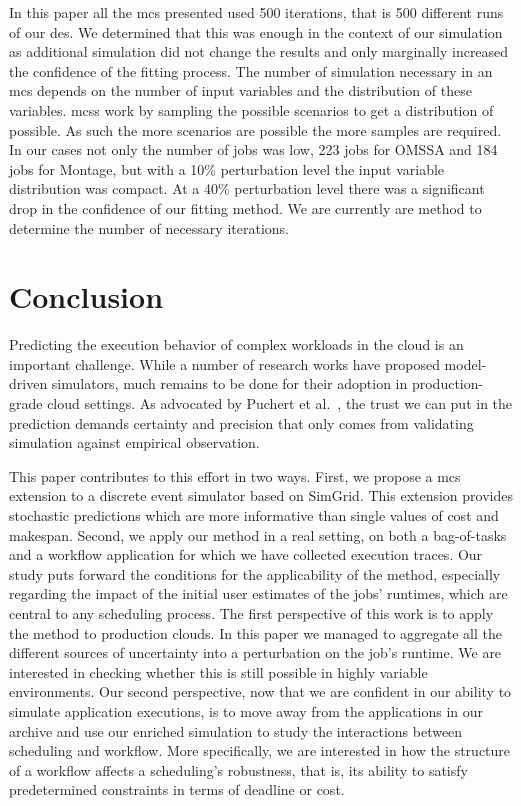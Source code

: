 \documentclass[10pt,conference,compsocconf]{IEEEtran}
\begin{document}
In this paper all the \ac{mcs} presented used 500 iterations, that is 500
different runs of our \ac{des}. We determined that this was enough in the
context of our simulation as additional simulation did not change the results
and only marginally increased the confidence of the fitting process. The number
of simulation necessary in an \ac{mcs} depends on the number of input variables
and the distribution of these variables. \aclp{mcs} work by sampling the possible
scenarios to get a distribution of possible. As such the more scenarios are
possible the more samples are required. In our cases not only the number of jobs
was low, 223 jobs for OMSSA and 184 jobs for Montage, but with a 10\%
perturbation level the input variable distribution was compact. At a 40\%
perturbation level there was a significant drop in the confidence of our fitting
method. We are currently are method to determine the number of necessary
iterations.

\section{Conclusion}
Predicting  the execution  behavior  of complex  workloads in  the  cloud is  an
important challenge. While a number of research works have proposed model-driven
simulators, much remains to be done for their adoption in production-grade cloud
settings. As  advocated by Puchert  et al.~\cite{PucherGWK15}, the trust  we can
put in  the prediction  demands certainty  and precision  that only  comes from
validating simulation against empirical observation.

This paper contributes to this effort in two ways. First, we propose a
\acl{mcs} extension to a discrete event simulator based on SimGrid. This
extension provides stochastic predictions which are more informative than single
values of cost and makespan. Second, we apply our method in a real setting,
on both a bag-of-tasks and a workflow application for which we have collected
execution traces. Our study puts forward the conditions for the applicability of
the method, especially regarding the impact of the initial user estimates of the
jobs' runtimes, which are central to any scheduling process. The first
perspective of this work is to apply the method to production clouds. In this
paper we managed to aggregate all the different sources of uncertainty into a
perturbation on the job's runtime. We are interested in checking whether this is
still possible in highly variable environments. Our second perspective, now that
we are confident in our ability to simulate application executions, is to move
away from the applications in our archive and use our enriched simulation to
study the interactions between scheduling and workflow. More specifically, we
are interested in how the structure of a workflow affects a scheduling's
robustness, that is, its ability to satisfy predetermined constraints in terms of
deadline or cost.










\newpage
\end{document}
